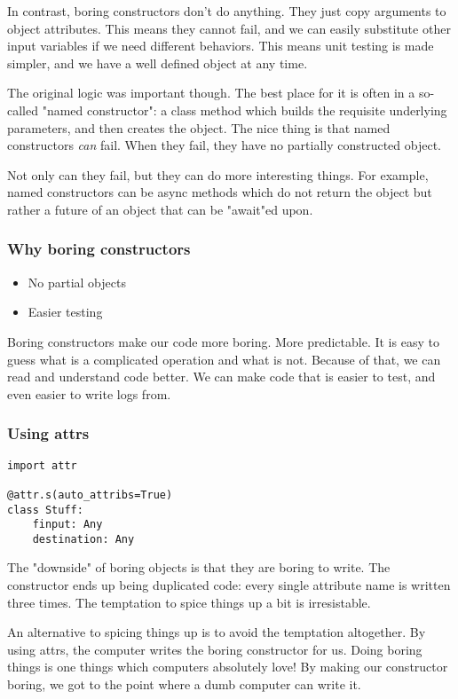 \documentclass[ignorenonframetext,aspectration=169]{beamer}
\begin{document}
In contrast,
boring constructors don't do anything.
They just copy arguments to object attributes.
This means they cannot fail,
and we can easily substitute other input variables if we need
different behaviors.
This means unit testing is made simpler,
and we have a well defined object at any time.

The original logic was important though.
The best place for it is often in a so-called
"named constructor":
a class method which builds the requisite underlying parameters,
and then creates the object.
The nice thing is that named constructors
{\em can}
fail.
When they fail,
they have no partially constructed object.

Not only can they fail,
but they can do more interesting things.
For example,
named constructors can be async methods
which do not return the object
but rather a future of an object
that can be "await"ed upon.


\begin{frame}[fragile]
\frametitle{Why boring constructors}

\begin{itemize}
\item No partial objects
\item Easier testing
\end{itemize}

\end{frame}

Boring constructors make our code more boring.
More predictable.
It is easy to guess what is a complicated operation
and what is not.
Because of that,
we can read and understand code better.
We can make code that is easier to test,
and even easier to write logs from.

\begin{frame}[fragile]
\frametitle{Using attrs}

\begin{lstlisting}
import attr

@attr.s(auto_attribs=True)
class Stuff:
    finput: Any
    destination: Any
\end{lstlisting}

\end{frame}

The "downside" of boring objects is that they
are boring to write.
The constructor ends up being duplicated code:
every single attribute name is written three times.
The temptation to spice things up a bit is irresistable.

An alternative to spicing things up
is to avoid the temptation altogether.
By using attrs,
the computer writes the boring constructor for us.
Doing boring things is one things which computers absolutely love!
By making our constructor boring,
we got to the point where a dumb computer can write it.
\end{document}
